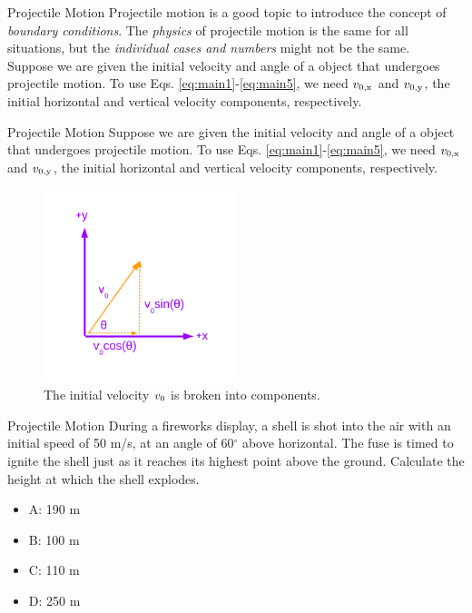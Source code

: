 \documentclass{beamer}
\begin{document}
\begin{frame}{Projectile Motion}
\small
Projectile motion is a good topic to introduce the concept of \textit{boundary conditions}.  The \textit{physics} of projectile motion is the same for all situations, but the \textit{individual cases and numbers} might not be the same. \\
\vspace{0.5cm}
Suppose we are given the initial velocity and angle of a object that undergoes projectile motion.  To use Eqs. \ref{eq:main1}-\ref{eq:main5}, we need $v_{\rm 0,x}$ and $v_{\rm 0,y}$, the initial horizontal and vertical velocity components, respectively.
\end{frame}

\begin{frame}{Projectile Motion}
\small
Suppose we are given the initial velocity and angle of a object that undergoes projectile motion.  To use Eqs. \ref{eq:main1}-\ref{eq:main5}, we need $v_{\rm 0,x}$ and $v_{\rm 0,y}$, the initial horizontal and vertical velocity components, respectively.\\
\begin{figure}
\centering
\includegraphics[width=0.5\textwidth,trim=1cm 1cm 1cm 1cm,clip=true]{figures/Vectors1.pdf}
\caption{\label{fig:components} The initial velocity $v_{\rm 0}$ is broken into components.}
\end{figure}
\end{frame}

\begin{frame}{Projectile Motion}
\small
During a fireworks display, a shell is shot into the air with an initial speed of 50 m/s, at an angle of 60$^{\circ}$ above horizontal.  The fuse is timed to ignite the shell just as it reaches its highest point above the ground.  Calculate the height at which the shell explodes.
\begin{itemize}
\item A: 190 m
\item B: 100 m
\item C: 110 m
\item D: 250 m
\end{itemize}
\end{frame}
\end{document}
